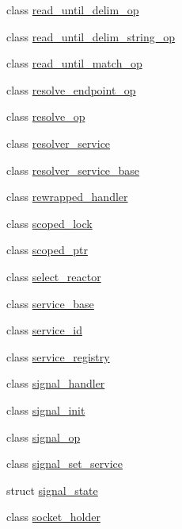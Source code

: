 \begin{DoxyCompactItemize}
\item 
class \hyperlink{classasio_1_1detail_1_1read__until__delim__op}{read\+\_\+until\+\_\+delim\+\_\+op}
\item 
class \hyperlink{classasio_1_1detail_1_1read__until__delim__string__op}{read\+\_\+until\+\_\+delim\+\_\+string\+\_\+op}
\item 
class \hyperlink{classasio_1_1detail_1_1read__until__match__op}{read\+\_\+until\+\_\+match\+\_\+op}
\item 
class \hyperlink{classasio_1_1detail_1_1resolve__endpoint__op}{resolve\+\_\+endpoint\+\_\+op}
\item 
class \hyperlink{classasio_1_1detail_1_1resolve__op}{resolve\+\_\+op}
\item 
class \hyperlink{classasio_1_1detail_1_1resolver__service}{resolver\+\_\+service}
\item 
class \hyperlink{classasio_1_1detail_1_1resolver__service__base}{resolver\+\_\+service\+\_\+base}
\item 
class \hyperlink{classasio_1_1detail_1_1rewrapped__handler}{rewrapped\+\_\+handler}
\item 
class \hyperlink{classasio_1_1detail_1_1scoped__lock}{scoped\+\_\+lock}
\item 
class \hyperlink{classasio_1_1detail_1_1scoped__ptr}{scoped\+\_\+ptr}
\item 
class \hyperlink{classasio_1_1detail_1_1select__reactor}{select\+\_\+reactor}
\item 
class \hyperlink{classasio_1_1detail_1_1service__base}{service\+\_\+base}
\item 
class \hyperlink{classasio_1_1detail_1_1service__id}{service\+\_\+id}
\item 
class \hyperlink{classasio_1_1detail_1_1service__registry}{service\+\_\+registry}
\item 
class \hyperlink{classasio_1_1detail_1_1signal__handler}{signal\+\_\+handler}
\item 
class \hyperlink{classasio_1_1detail_1_1signal__init}{signal\+\_\+init}
\item 
class \hyperlink{classasio_1_1detail_1_1signal__op}{signal\+\_\+op}
\item 
class \hyperlink{classasio_1_1detail_1_1signal__set__service}{signal\+\_\+set\+\_\+service}
\item 
struct \hyperlink{structasio_1_1detail_1_1signal__state}{signal\+\_\+state}
\item 
class \hyperlink{classasio_1_1detail_1_1socket__holder}{socket\+\_\+holder}
\item 

\end{DoxyCompactItemize}
